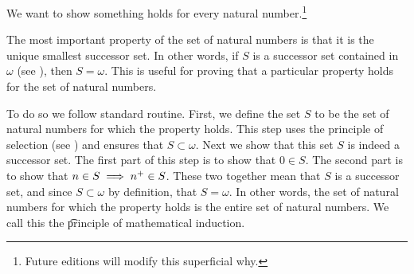 

We want to show something holds for every natural number.\footnote{Future editions will modify this superficial why.}


The most important property of the set of natural numbers is that it is the unique smallest successor set.
In other words, if $S$ is a successor set contained in $\omega$ (see ), then $S = \omega$.
This is useful for proving that a particular property holds for the set of natural numbers.

To do so we follow standard routine.
First, we define the set $S$ to be the set of natural numbers for which the property holds.
This step uses the principle of selection (see ) and ensures that $S \subset \omega$.
Next we show that this set $S$ is indeed a successor set.
The first part of this step is to show that $0 \in S$.
The second part is to show that $n \in S \implies {n}^{+} \in S$.
These two together mean that $S$ is a successor set, and since $S \subset \omega$ by definition, that $S = \omega$.
In other words, the set of natural numbers for which the property holds is the entire set of natural numbers.
We call this the \t{principle of mathematical induction.}


%
%

\blankpage
